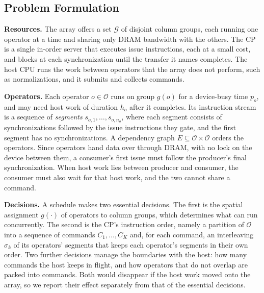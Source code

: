 \subsection{Problem Formulation}
\label{subsec:formulation}

\textbf{Resources.}
The array offers a set $\mathcal{G}$ of disjoint column groups, each running one operator at a time and sharing only DRAM bandwidth with the others.
The CP is a single in-order server that executes issue instructions, each at a small cost, and blocks at each synchronization until the transfer it names completes.
The host CPU runs the work between operators that the array does not perform, such as normalizations, and it submits and collects commands.

\textbf{Operators.}
Each operator $o \in \mathcal{O}$ runs on group $g(o)$ for a device-busy time $p_o$, and may need host work of duration $h_o$ after it completes.
Its instruction stream is a sequence of \emph{segments} $s_{o,1}, \dots, s_{o,n_o}$, where each segment consists of synchronizations followed by the issue instructions they gate, and the first segment has no synchronizations.
A dependency graph $E \subseteq \mathcal{O} \times \mathcal{O}$ orders the operators.
Since operators hand data over through DRAM, with no lock on the device between them, a consumer's first issue must follow the producer's final synchronization.
When host work lies between producer and consumer, the consumer must also wait for that host work, and the two cannot share a command.

\textbf{Decisions.}
A schedule makes two essential decisions.
The first is the spatial assignment $g(\cdot)$ of operators to column groups, which determines what can run concurrently.
The second is the CP's instruction order, namely a partition of $\mathcal{O}$ into a sequence of commands $C_1, \dots, C_K$ and, for each command, an interleaving $\sigma_k$ of its operators' segments that keeps each operator's segments in their own order.
Two further decisions manage the boundaries with the host: how many commands the host keeps in flight, and how operators that do not overlap are packed into commands.
Both would disappear if the host work moved onto the array, so we report their effect separately from that of the essential decisions.

